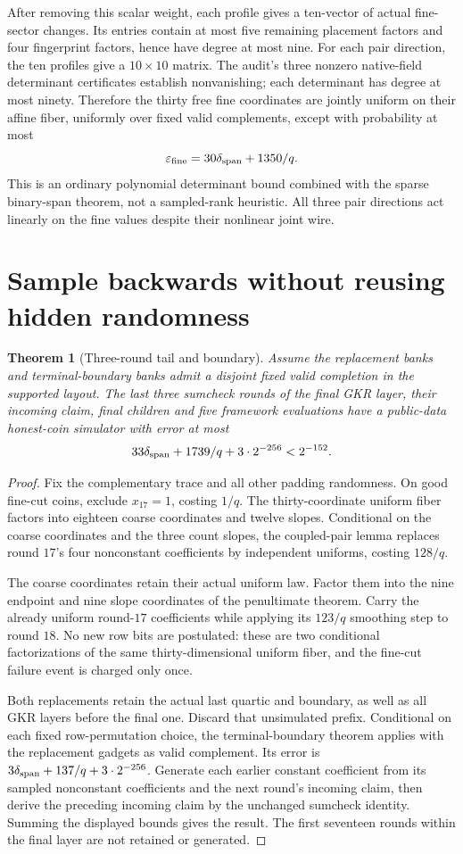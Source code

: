 \documentclass[11pt]{article}
\newtheorem{theorem}[lemma]{Theorem}
\begin{document}
After removing this scalar weight, each profile gives a ten-vector of actual fine-sector changes. Its entries contain at most five remaining placement factors and four fingerprint factors, hence have degree at most nine. For each pair direction, the ten profiles give a $10\times10$ matrix. The audit's three nonzero native-field determinant certificates establish nonvanishing; each determinant has degree at most ninety. Therefore the thirty free fine coordinates are jointly uniform on their affine fiber, uniformly over fixed valid complements, except with probability at most
\[
 \varepsilon_{\rm fine}=30\delta_{\rm span}+1350/q.
\]
This is an ordinary polynomial determinant bound combined with the sparse binary-span theorem, not a sampled-rank heuristic. All three pair directions act linearly on the fine values despite their nonlinear joint wire.

\section{Sample backwards without reusing hidden randomness}

\begin{theorem}[Three-round tail and boundary]
Assume the replacement banks and terminal-boundary banks admit a disjoint fixed valid completion in the supported layout. The last three sumcheck rounds of the final GKR layer, their incoming claim, final children and five framework evaluations have a public-data honest-coin simulator with error at most
\[
 33\delta_{\rm span}+1739/q+3\cdot2^{-256}<2^{-152}.
\]
\end{theorem}
\begin{proof}
Fix the complementary trace and all other padding randomness. On good fine-cut coins, exclude $x_{17}=1$, costing $1/q$. The thirty-coordinate uniform fiber factors into eighteen coarse coordinates and twelve slopes. Conditional on the coarse coordinates and the three count slopes, the coupled-pair lemma replaces round $17$'s four nonconstant coefficients by independent uniforms, costing $128/q$.

The coarse coordinates retain their actual uniform law. Factor them into the nine endpoint and nine slope coordinates of the penultimate theorem. Carry the already uniform round-$17$ coefficients while applying its $123/q$ smoothing step to round $18$. No new row bits are postulated: these are two conditional factorizations of the same thirty-dimensional uniform fiber, and the fine-cut failure event is charged only once.

Both replacements retain the actual last quartic and boundary, as well as all GKR layers before the final one. Discard that unsimulated prefix. Conditional on each fixed row-permutation choice, the terminal-boundary theorem applies with the replacement gadgets as valid complement. Its error is $3\delta_{\rm span}+137/q+3\cdot2^{-256}$. Generate each earlier constant coefficient from its sampled nonconstant coefficients and the next round's incoming claim, then derive the preceding incoming claim by the unchanged sumcheck identity. Summing the displayed bounds gives the result. The first seventeen rounds within the final layer are not retained or generated.
\end{proof}
\end{document}
